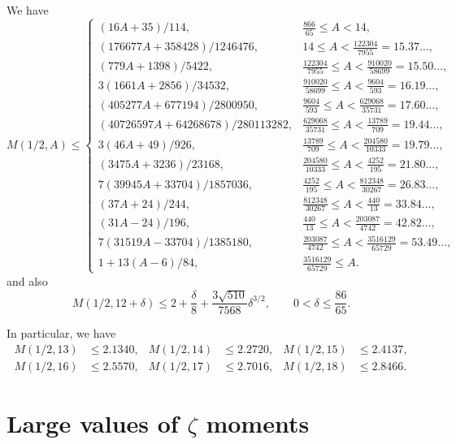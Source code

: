 \begin{theorem}[Moment bounds for $\sigma=1/2$]\label{M_bound_larger_A}\cite[Theorems 2.1, 2.2]{trudgian-yang}
    We have
    \[
    M(1/2, A) \leq \begin{cases}
        (16A + 35)/114 ,& \frac{866}{65} \leq A < 14, \\
         (176677A + 358428)/1246476 ,& 14 \leq A < \frac{122304}{7955} = 15.37\ldots, \\
         (779A + 1398)/5422 ,& \frac{122304}{7955} \leq A < \frac{910020}{58699} = 15.50\ldots, \\
         3(1661A + 2856)/34532 ,& \frac{910020}{58699} \leq A < \frac{9604}{593} = 16.19\ldots, \\
         (405277A + 677194)/2800950 ,& \frac{9604}{593} \leq A < \frac{629068}{35731} = 17.60\ldots, \\
         (40726597A + 64268678)/280113282 ,& \frac{629068}{35731} \leq A < \frac{13789}{709} = 19.44\ldots, \\
         3(46A + 49)/926 ,& \frac{13789}{709} \leq A < \frac{204580}{10333} = 19.79\ldots,\\
         (3475A + 3236)/23168 ,& \frac{204580}{10333} \leq A < \frac{4252}{195} = 21.80\ldots, \\
         7(39945A + 33704)/1857036 ,& \frac{4252}{195} \leq A < \frac{812348}{30267} = 26.83\ldots, \\
         (37A + 24)/244 ,& \frac{812348}{30267} \leq A < \frac{440}{13} = 33.84\ldots, \\
         (31A - 24)/196 ,& \frac{440}{13} \leq A < \frac{203087}{4742} = 42.82\ldots, \\
         7(31519A - 33704)/1385180 ,& \frac{203087}{4742} \leq A < \frac{3516129}{65729} = 53.49\ldots, \\
        1 + 13(A - 6)/84 ,& \frac{3516129}{65729} \leq A.
    \end{cases}
    \]
   and also
   \[
    M(1/2, 12 + \delta) \le 2 + \frac{\delta}{8} + \frac{3\sqrt{510}}{7568}\delta^{3/2},\qquad 0 < \delta \le \frac{86}{65}.
    \]
\end{theorem}
    In particular, we have
    \begin{align*}
    M(1/2,13) &\le 2.1340,&M(1/2,14) &\le 2.2720,&M(1/2,15) &\le 2.4137,\\
    M(1/2,16) &\le 2.5570,&M(1/2,17) &\le 2.7016,&M(1/2,18) &\le 2.8466.
\end{align*}


\section{Large values of \texorpdfstring{$\zeta$}{zeta} moments}

